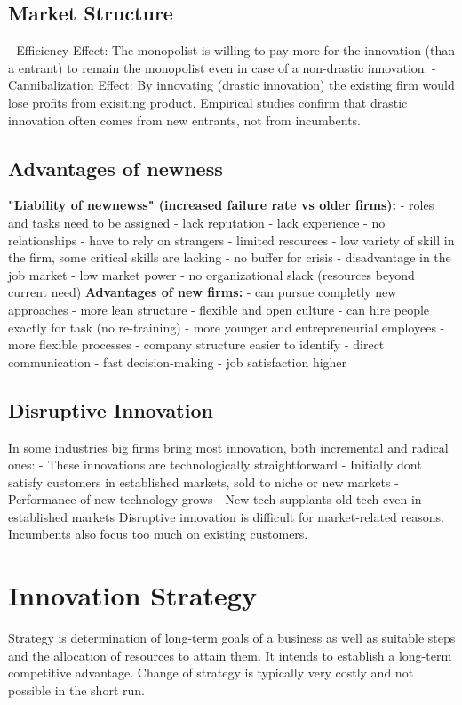 \documentclass{scrartcl}
\begin{document}
\subsection*{Market Structure}
- Efficiency Effect: The monopolist is willing to pay more for the innovation (than a entrant) to remain the monopolist even in case of a non-drastic innovation.
- Cannibalization Effect: By innovating (drastic innovation) the existing firm would lose profits from exisiting product.
Empirical studies confirm that drastic innovation often comes from new entrants, not from incumbents.
\subsection*{Advantages of newness}
\textbf{"Liability of newnewss" (increased failure rate vs older firms):}
- roles and tasks need to be assigned
- lack reputation
- lack experience
- no relationships
- have to rely on strangers
- limited resources
- low variety of skill in the firm, some critical skills are lacking
- no buffer for crisis
- disadvantage in the job market
- low market power
- no organizational slack (resources beyond current need)
\textbf{Advantages of new firms:}
- can pursue completly new approaches
- more lean structure
- flexible and open culture
- can hire people exactly for task (no re-training)
- more younger and entrepreneurial employees
- more flexible processes
- company structure easier to identify
- direct communication
- fast decision-making
- job satisfaction higher
\subsection*{Disruptive Innovation}
In some industries big firms bring most innovation, both incremental and radical ones:
- These innovations are technologically straightforward
- Initially dont satisfy customers in established markets, sold to niche or new markets
- Performance of new technology grows
- New tech supplants old tech even in established markets
Disruptive innovation is difficult for market-related reasons. Incumbents also focus too much on existing customers.

\section*{Innovation Strategy}
Strategy is determination of long-term goals of a business as well as suitable steps and the allocation of resources to attain them. It intends to establish a long-term competitive advantage.
Change of strategy is typically very costly and not possible in the short run.
\end{document}
